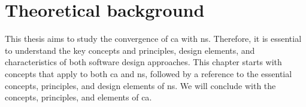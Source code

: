 \chapter{Theoretical background} \label{chap_theoreticalbackground} 

This thesis aims to study the convergence of \gls{ca} with \gls{ns}. Therefore, it is
essential to understand the key concepts and principles, design elements, and
characteristics of both software design approaches. This chapter starts with concepts that
apply to both \gls{ca} and \gls{ns}, followed by a reference to the essential concepts,
principles, and design elements of \gls{ns}. We will conclude with the concepts,
principles, and elements of \gls{ca}.




